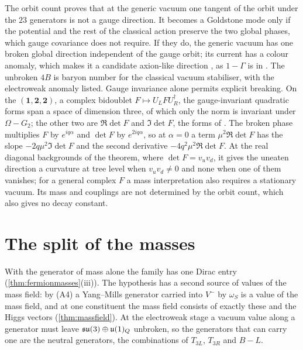 The orbit count proves that at the generic vacuum one tangent of the orbit under the $23$ generators is not a gauge direction. It becomes a
Goldstone mode only if the potential and the rest of the classical action preserve the two global phases, which gauge covariance does not
require. If they do, the generic vacuum has one broken global direction independent of the gauge orbit; its current has a colour anomaly,
which makes it a candidate axion-like direction \cite{PecceiQuinn77,Weinberg78,Wilczek78}, as $1-\Gamma$ is in . The unbroken
$4B$ is baryon number for the classical vacuum stabiliser, with the electroweak anomaly listed. Gauge invariance alone permits explicit
breaking. On the $(\mathbf1,\mathbf2,\mathbf2)$, a complex bidoublet $F\mapsto U_LFU_R^\dagger$, the gauge-invariant quadratic forms span a
space of dimension three, of which only the norm is invariant under $\Omega-G_2$; the other two are $\Re\det F$ and $\Im\det F$, the forms of
. The broken phase multiplies $F$ by $e^{iq\alpha}$ and $\det F$ by $e^{2iq\alpha}$, so at $\alpha=0$ a term $\mu^2\Re\det F$ has the slope
$-2q\mu^2\Im\det F$ and the second derivative $-4q^2\mu^2\Re\det F$. At the real diagonal backgrounds of the theorem, where
$\det F=v_uv_d$, it gives the uneaten direction a curvature at tree level when $v_uv_d\ne0$ and none when one of them vanishes; for a general
complex $F$ a mass interpretation also requires a stationary vacuum. Its mass and couplings are not determined by the orbit count, which
also gives no decay constant.

\section{The split of the masses}
\label{sec:split}

With the generator of mass alone the family has one Dirac entry (\cref{thm:fermionmasses}(iii)). The hypothesis has a second source of values
of the mass field: by (A4) a Yang--Mills generator carried into $V^-$ by $\omega_S$ is a value of the mass field, and at one constituent the
mass field consists of exactly these and the Higgs vectors (\cref{thm:massfield}). At the electroweak stage a vacuum value along a generator
must leave $\mathfrak{su}(3)\oplus\mathfrak{u}(1)_Q$ unbroken, so the generators that can carry one are the neutral generators, the combinations of $T_{3L}$,
$T_{3R}$ and $B\!-\!L$.

